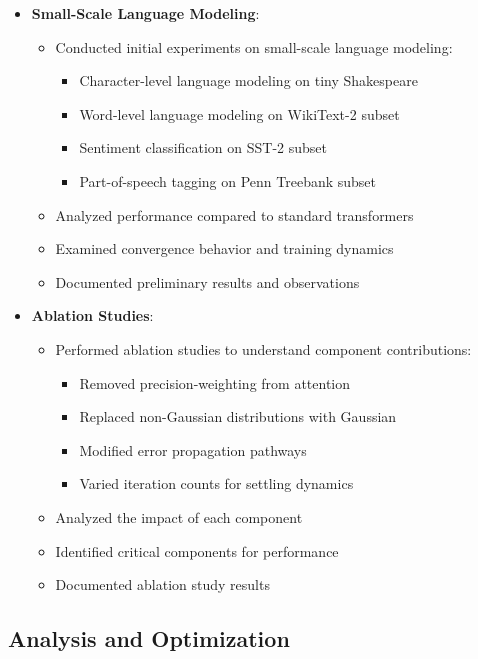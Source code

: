 \documentclass{article}
\begin{document}
\begin{itemize}
  \item \textbf{Small-Scale Language Modeling}:
  \begin{itemize}
    \item Conducted initial experiments on small-scale language modeling:
    \begin{itemize}
      \item Character-level language modeling on tiny Shakespeare
      \item Word-level language modeling on WikiText-2 subset
      \item Sentiment classification on SST-2 subset
      \item Part-of-speech tagging on Penn Treebank subset
    \end{itemize}
    \item Analyzed performance compared to standard transformers
    \item Examined convergence behavior and training dynamics
    \item Documented preliminary results and observations
  \end{itemize}

  \item \textbf{Ablation Studies}:
  \begin{itemize}
    \item Performed ablation studies to understand component contributions:
    \begin{itemize}
      \item Removed precision-weighting from attention
      \item Replaced non-Gaussian distributions with Gaussian
      \item Modified error propagation pathways
      \item Varied iteration counts for settling dynamics
    \end{itemize}
    \item Analyzed the impact of each component
    \item Identified critical components for performance
    \item Documented ablation study results
  \end{itemize}
\end{itemize}

\subsection{Analysis and Optimization}
\end{document}

